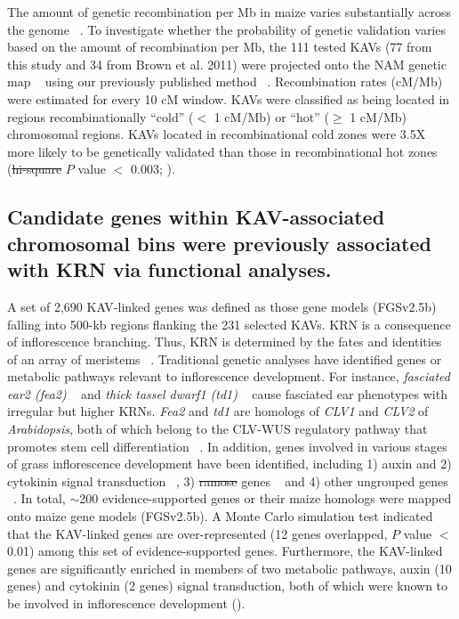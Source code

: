 \documentclass[10pt,letterpaper]{article}
\providecommand{\DIFaddtex}[1]{{\protect\color{blue}\uwave{#1}}} %
\providecommand{\DIFdeltex}[1]{{\protect\color{red}\sout{#1}}}                      %
\providecommand{\DIFaddbegin}{} %
\providecommand{\DIFaddend}{} %
\providecommand{\DIFdelbegin}{} %
\providecommand{\DIFdelend}{} %
\providecommand{\DIFadd}[1]{\texorpdfstring{\DIFaddtex{#1}}{#1}} %
\providecommand{\DIFdel}[1]{\texorpdfstring{\DIFdeltex{#1}}{}} %
\begin{document}
The amount of genetic recombination per Mb in maize varies substantially across the genome ~\cite{Fu2002}. To investigate whether the probability of genetic validation varies based on the amount of recombination per Mb, the 111 tested KAVs (77 from this study and 34 from Brown et al. 2011) were projected onto the NAM genetic map ~\cite{Buckler2009} using our previously published method ~\cite{Liu2009}. Recombination rates (cM/Mb) were estimated for every 10 cM window. KAVs were classified as being located in regions recombinationally “cold” ($<$ 1 cM/Mb) or “hot” ($\geq$ 1 cM/Mb) chromosomal regions. KAVs located in recombinational cold zones were 3.5X more likely to be genetically validated than those in recombinational hot zones (\DIFdelbegin \DIFdel{hi-square }\DIFdelend \DIFaddbegin \DIFadd{Chi-square }\DIFaddend $P$ value $<$ 0.003; ). 

\subsection*{Candidate genes within KAV-associated chromosomal bins were previously associated with KRN via functional analyses.}
A set of 2,690 KAV-linked genes was defined as those gene models (FGSv2.5b) falling into 500-kb regions flanking the 231 selected KAVs. KRN is a consequence of inflorescence branching. Thus, KRN is determined by the fates and identities of an array of meristems ~\cite{Barazesh2008}. Traditional genetic analyses have identified genes or metabolic pathways relevant to inflorescence development. For instance, \emph{fasciated ear2 (fea2)} ~\cite{Bommert2013} and \emph{thick tassel dwarf1 (td1)} ~\cite{Bommert2005} cause fasciated ear phenotypes with irregular but higher KRNs. \emph{Fea2} and \emph{td1} are homologs of \emph{CLV1} and \emph{CLV2} of \emph{Arabidopsis}, both of which belong to the CLV-WUS regulatory pathway that promotes stem cell differentiation ~\cite{Clark2001}. In addition, genes involved in various stages of grass inflorescence development have been identified, including 1) auxin and 2) cytokinin signal transduction ~\cite{Barazesh2008, Sigmon2010}, 3) \DIFdelbegin \DIFdel{ramose }\DIFdelend \DIFaddbegin \emph{\DIFadd{ramosa}} \DIFaddend genes ~\cite{Bortiri2006} and 4) other ungrouped genes ~\cite{McSteen2001, Upadyayula2006, Xu2011}. In total, $\sim$200 evidence-supported genes or their maize homologs were mapped onto maize gene models (FGSv2.5b). A Monte Carlo simulation test indicated that the KAV-linked genes are over-represented (12 genes overlapped, $P$ value $<$ 0.01) among this set of evidence-supported genes. Furthermore, the KAV-linked genes are significantly enriched in members of two metabolic pathways, auxin (10 genes) and cytokinin (2 genes) signal transduction, both of which were known to be involved in inflorescence development (). 
\end{document}
